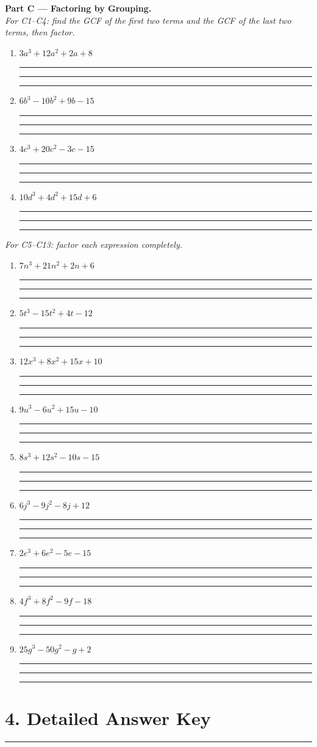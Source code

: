 \documentclass[11pt]{article}
\newcommand{\sectionrule}{\vspace{2pt}\hrule\vspace{8pt}}
\newcommand{\rline}{\par\vspace{0.75cm}\noindent\textcolor{black!25}{\rule{\linewidth}{0.3pt}}}
\newcommand{\workspace}{\rline\rline\rline\vspace{2pt}}
\begin{document}
\medskip
\noindent\textbf{\textcolor{brandblue}{Part C --- Factoring by Grouping.}}\\
\textit{For C1--C4: find the GCF of the first two terms and the GCF of the last two terms, then factor.}
\begin{enumerate}[label=\textbf{C\arabic*.},leftmargin=2.6em,itemsep=4pt]
  \item $3a^3 + 12a^2 + 2a + 8$ \workspace
  \item $6b^3 - 10b^2 + 9b - 15$ \workspace
  \item $4c^3 + 20c^2 - 3c - 15$ \workspace
  \item $10d^3 + 4d^2 + 15d + 6$ \workspace
\end{enumerate}
\textit{For C5--C13: factor each expression completely.}
\begin{enumerate}[label=\textbf{C\arabic*.},leftmargin=2.6em,itemsep=4pt,start=5]
  \item $7n^3 + 21n^2 + 2n + 6$ \workspace
  \item $5t^3 - 15t^2 + 4t - 12$ \workspace
  \item $12x^3 + 8x^2 + 15x + 10$ \workspace
  \item $9u^3 - 6u^2 + 15u - 10$ \workspace
  \item $8s^3 + 12s^2 - 10s - 15$ \workspace
  \item $6j^3 - 9j^2 - 8j + 12$ \workspace
  \item $2e^3 + 6e^2 - 5e - 15$ \workspace
  \item $4f^3 + 8f^2 - 9f - 18$ \workspace
  \item $25g^3 - 50g^2 - g + 2$ \workspace
\end{enumerate}

\newpage
\section*{\textcolor{brandteal}{4. Detailed Answer Key}}
\sectionrule
\end{document}
